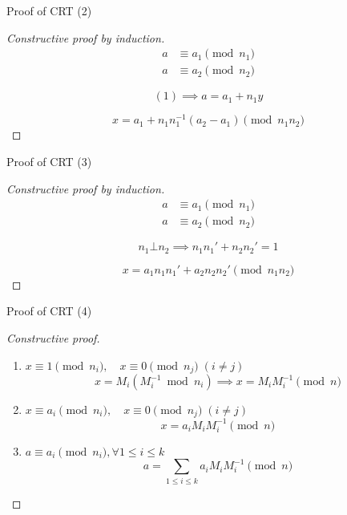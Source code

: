 \begin{frame}{Proof of CRT (2)}
  \begin{proof}[Constructive proof by induction]
	\begin{align}
	  a &\equiv a_1 \pmod{n_1} \\
	  a &\equiv a_2 \pmod{n_2}
	\end{align}

	\pause
	\[
	  (1) \implies a = a_1 + n_1 y
	\]

	\pause
	\[
      x = a_1 + n_1n_1^{-1}(a_2 - a_1) \pmod{n_1n_2}
	\]
  \end{proof}

\end{frame}
\begin{frame}{Proof of CRT (3)}
  \begin{proof}[Constructive proof by induction]
	\begin{align}
	  a &\equiv a_1 \pmod{n_1} \\
	  a &\equiv a_2 \pmod{n_2}
	\end{align}

	\[
	  n_1 \bot n_2 \implies n_1n_1' + n_2n_2' = 1
	\]

	\pause
	\[
	  x = a_1n_1n_1' + a_2n_2n_2' \pmod{n_1n_2}
	\]
  \end{proof}
\end{frame}
\begin{frame}{Proof of CRT (4)}
  \begin{proof}[Constructive proof]
	\begin{enumerate}[<+->]
	  \item $x \equiv 1 \pmod{n_i}, \quad x \equiv 0 \pmod{n_j}\; (i \neq j)$
		\[
		  x = M_i(M_i^{-1} \bmod n_i) \implies x = M_iM_i^{-1} \pmod{n}
		\]
	  \item $x \equiv a_i \pmod{n_i}, \quad x \equiv 0 \pmod{n_j}\; (i \neq j)$
		\[
		  x = a_i M_iM_i^{-1} \pmod{n}
		\]
	  \item $a \equiv a_i \pmod{n_i}, \forall 1 \le i \le k$
		\[
		  a = \sum_{1 \le i \le k} a_i M_iM_i^{-1} \pmod{n}
		\]
	\end{enumerate}
  \end{proof}
\end{frame}
